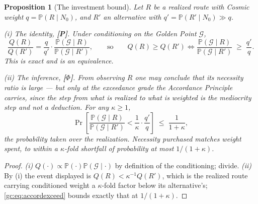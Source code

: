 \documentclass[11pt]{article}
\numberwithin{equation}{section}
\theoremstyle{plain}
\newtheorem{proposition}[theorem]{Proposition}
\theoremstyle{definition}
\theoremstyle{remark}
\newcommand{\PP}{\mathbb{P}}
\begin{document}
\begin{proposition}[The investment bound]\label{ra:prop:investment}
Let $R$ be a realized route with Cosmic weight $q=\PP(R\mid N_0)$, and
$R'$ an alternative with $q'=\PP(R'\mid N_0)\gg q$.

\emph{(i) The identity, \textbf{[P]}.} Under conditioning on the Golden
Point $\mathcal G$,
\begin{equation}\label{ra:eq:invest}
\frac{Q(R)}{Q(R')}
=\frac{q}{q'}\cdot\frac{\PP(\mathcal G\mid R)}{\PP(\mathcal G\mid R')},
\qquad\text{so}\qquad
Q(R)\ge Q(R')
\iff
\frac{\PP(\mathcal G\mid R)}{\PP(\mathcal G\mid R')}\;\ge\;\frac{q'}{q}.
\end{equation}
This is exact and is an equivalence.

\emph{(ii) The inference, \textbf{[$\Phi$]}.} From \emph{observing} $R$
one may conclude that its necessity ratio is large --- but only at the
exceedance grade the Accordance Principle carries, since the step from
what is realized to what is weighted is the mediocrity step and not a
deduction. For any $\kappa\ge1$,
\begin{equation}\label{ra:eq:investexceed}
\Pr\left[\frac{\PP(\mathcal G\mid R)}{\PP(\mathcal G\mid R')}
<\frac1\kappa\cdot\frac{q'}{q}\right]\;\le\;\frac{1}{1+\kappa},
\end{equation}
the probability taken over the realization. \emph{Necessity purchased
matches weight spent, to within a $\kappa$-fold shortfall of probability
at most $1/(1+\kappa)$.}
\end{proposition}

\begin{proof}
\emph{(i)} $Q(\cdot)\propto\PP(\cdot)\PP(\mathcal G\mid\cdot)$ by
definition of the conditioning; divide. \emph{(ii)} By (i) the event
displayed is $Q(R)<\kappa^{-1}Q(R')$, which is the realized route
carrying conditioned weight a $\kappa$-fold factor below its
alternative's; \eqref{gc:eq:accordexceed} bounds exactly that at
$1/(1+\kappa)$.
\end{proof}
\end{document}
